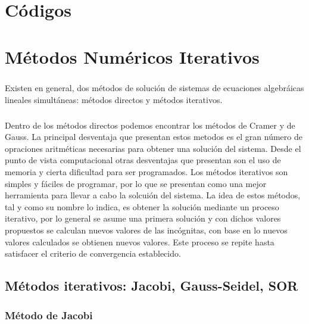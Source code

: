 \documentclass[letterpaper, openright, 12pt]{book}
\begin{document}
%
%
%
%
%

%
%
%
%
%
\appendix
\chapter{Códigos}\label{appCode}
%
%
%
%
%

%
%
%
%
%
\chapter{Métodos Numéricos Iterativos}\label{appIter}
    \paragraph*{}
        Existen en general, dos métodos de solución de sistemas de ecuaciones
        algebráicas lineales simultáneas: métodos directos y métodos iterativos.

    \paragraph*{}
        Dentro de los métodos directos podemos encontrar los métodos de Cramer y
        de Gauss. La principal desventaja que presentan estos metodos es el gran
        número de opraciones aritméticas necesarias para obtener una solución
        del sistema. Desde el punto de vista computacional otras desventajas que
        presentan son el uso de memoria y cierta dificultad para ser programados.
        Los métodos iterativos son simples y fáciles de programar, por lo que se
        presentan como una mejor herramienta para llevar a cabo la solcuión del
        sistema. La idea de estos métodos, tal y como su nombre lo indica, es
        obtener la solución mediante un proceso iterativo, por lo general se
        asume una primera solución y con dichos valores propuestos se calculan
        nuevos valores de las incógnitas, con base en lo nuevos valores
        calculados se obtienen nuevos valores. Este proceso se repite hasta
        satisfacer el criterio de convergencia establecido.

    \section{Métodos iterativos: Jacobi, Gauss-Seidel, SOR}
    \subsection{Método de Jacobi}
\end{document}
